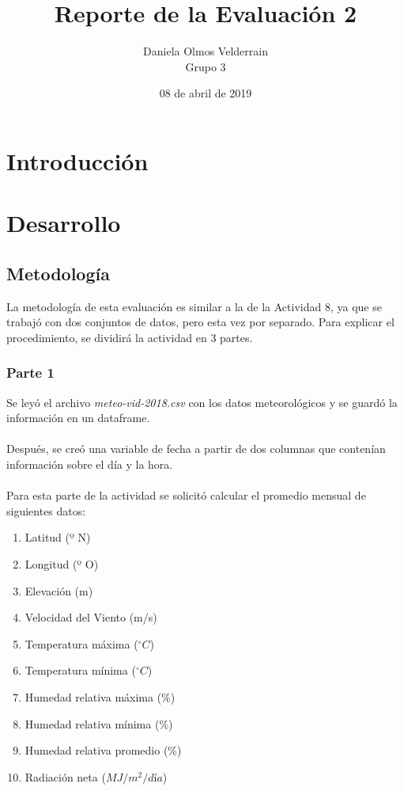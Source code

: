\documentclass[letterpaper,12pt]{article}
\begin{document}
\title{Reporte de la Evaluación 2}
\author{Daniela Olmos Velderrain\\Grupo 3}
\date{08 de abril de 2019}

\maketitle

\section{Introducción}
    
\section{Desarrollo}

\subsection{Metodología} 
La metodología de esta evaluación es similar a la de la Actividad 8, ya que se trabajó con dos conjuntos de datos, pero esta vez por separado. Para explicar el procedimiento, se dividirá la actividad en 3 partes.

\subsubsection{Parte 1}
Se leyó el archivo \emph{meteo-vid-2018.csv} con los datos meteorológicos y se guardó la información en un dataframe.\\\\
Después, se creó una variable de fecha a partir de dos columnas que contenían información sobre el día y la hora.\\\\
Para esta parte de la actividad se solicitó calcular el promedio mensual de siguientes datos:

\begin{enumerate}
    \item Latitud (º N) 
    \item Longitud (º O)
    \item Elevación (m)
    \item Velocidad del Viento (m/s)
    \item Temperatura máxima ($^{\circ}C$)
    \item Temperatura mínima ($^{\circ}C$)
    \item Humedad relativa máxima (\%)
    \item Humedad relativa mínima (\%)
    \item Humedad relativa promedio (\%)
    \item Radiación neta ($MJ/m^{2}/día$)
\end{enumerate}
\end{document}
